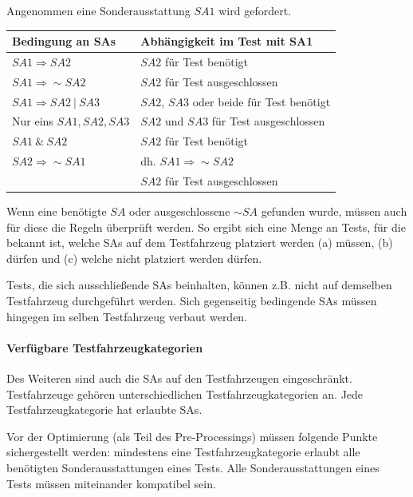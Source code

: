 Angenommen eine Sonderausstattung $SA1$ wird gefordert.

\begin{table}[H]
    \label{tab:tableSAs}
    \begin{tabularx}{\textwidth}{ | l | X |}
        Bedingung an SAs & Abhängigkeit im Test mit SA1 \\\hline\hline
        $SA1 \Rightarrow SA2$ & $SA2$ für Test benötigt \\\hline
        $SA1 \Rightarrow \sim SA2$ & $SA2$ für Test ausgeschlossen \\\hline
        $SA1 \Rightarrow SA2~|~SA3$ & $SA2$, $SA3$ oder beide für Test benötigt \\\hline
        Nur eins $SA1, SA2, SA3$ & $SA2$ und $SA3$ für Test ausgeschlossen \\\hline
        $SA1~\&~SA2$ & $SA2$  für Test benötigt \\\hline
        $SA2 \Rightarrow \sim SA1$ & dh. $SA1 \Rightarrow \sim SA2$ \\& $SA2$  für Test ausgeschlossen\\\hline
    \end{tabularx}
\end{table}
Wenn eine benötigte $SA$ oder ausgeschlossene $\sim SA$ gefunden wurde,
müssen auch für diese die Regeln überprüft werden. So ergibt sich eine Menge
an Tests, für die bekannt ist, welche SAs auf dem Testfahrzeug platziert werden
(a) müssen, (b) dürfen und (c) welche nicht platziert werden dürfen.

Tests, die sich ausschließende SAs beinhalten, können z.B. nicht auf demselben
Testfahrzeug durchgeführt werden. Sich gegenseitig bedingende SAs müssen
hingegen im selben Testfahrzeug verbaut werden.

\paragraph{Verfügbare Testfahrzeugkategorien}
Des Weiteren sind auch die SAs auf den Testfahrzeugen eingeschränkt.
Testfahrzeuge gehören unterschiedlichen Testfahrzeugkategorien an.
Jede Testfahrzeugkategorie hat erlaubte SAs.

Vor der Optimierung (als Teil des Pre-Processings) müssen folgende
Punkte sichergestellt werden: mindestens eine Testfahrzeugkategorie
erlaubt alle benötigten Sonderausstattungen eines Tests. Alle
Sonderausstattungen eines Tests müssen miteinander kompatibel sein.


